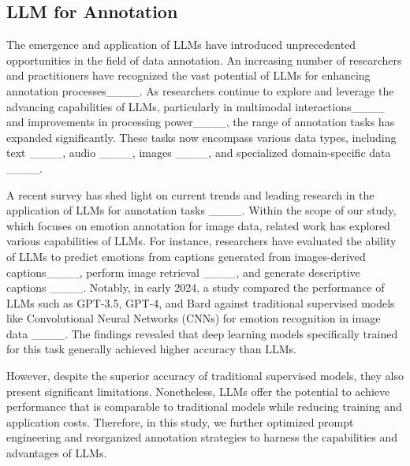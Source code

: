 \subsection{LLM for Annotation}

The emergence and application of LLMs have introduced unprecedented opportunities in the field of data annotation. An increasing number of researchers and practitioners have recognized the vast potential of LLMs for enhancing annotation processes____. As researchers continue to explore and leverage the advancing capabilities of LLMs, particularly in multimodal interactions____ and improvements in processing power____, the range of annotation tasks has expanded significantly. These tasks now encompass various data types, including text ____, audio ____, images ____, and specialized domain-specific data ____.

A recent survey has shed light on current trends and leading research in the application of LLMs for annotation tasks ____. Within the scope of our study, which focuses on emotion annotation for image data, related work has explored various capabilities of LLMs. For instance, researchers have evaluated the ability of LLMs to predict emotions from captions generated from images-derived captions____, perform image retrieval ____, and generate descriptive captions ____. Notably, in early 2024, a study compared the performance of LLMs such as GPT-3.5, GPT-4, and Bard against traditional supervised models like Convolutional Neural Networks (CNNs) for emotion recognition in image data ____. The findings revealed that deep learning models specifically trained for this task generally achieved higher accuracy than LLMs.

However, despite the superior accuracy of traditional supervised models, they also present significant limitations. Nonetheless, LLMs offer the potential to achieve performance that is comparable to traditional models while reducing training and application costs. Therefore, in this study, we further optimized prompt engineering and reorganized annotation strategies to harness the capabilities and advantages of LLMs. 

%